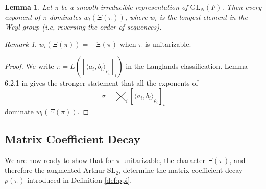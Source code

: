 \documentclass{amsart}
\newcommand{\mc}[1]{\mathcal{#1}}
\newcommand{\SL}{\mathrm{SL}}
\newcommand{\GL}{\mathrm{GL}}
\newcommand{\1}{\m 1}
\newtheorem{lem}[thm]{Lemma}
\theoremstyle{remark}
\newtheorem{rmk}[thm]{Remark}
\theoremstyle{definition}
\numberwithin{equation}{subsection}
\begin{document}


\begin{lem} \label{lem: dominant exponent}
Let $\pi$ be a smooth irreducible representation of $\GL_N(F)$. Then every exponent of $\pi$ dominates $w_l(\Xi(\pi))$, where  $w_l$ is the longest element in the Weyl group (i.e, reversing the order of sequences). 
\end{lem}

\begin{rmk}
$w_l(\Xi(\pi)) = -\Xi(\pi)$ when $\pi$ is unitarizable. 
\end{rmk}

\begin{proof}
We write $\pi = L([\langle a_i,b_i\rangle_{\rho_i}]_i)$ in the Langlands classification. Lemma 6.2.1 in \cite{DEP} gives the stronger statement that all the exponents of
\[
\sigma = \bigtimes_i [\langle a_i,b_i\rangle_{\rho_i}]_i
\]
dominate $w_l(\Xi(\pi))$. 
\end{proof}




\subsection{Matrix Coefficient Decay}\label{sec:matrixcoefficientdecay}
We are now ready to show that for $\pi$ unitarizable, the character $\Xi(\pi)$, and therefore the augmented Arthur-$\SL_2$, determine the matrix coefficient decay $p(\pi)$ introduced in Definition \ref{def:ppi}.
\end{document}
